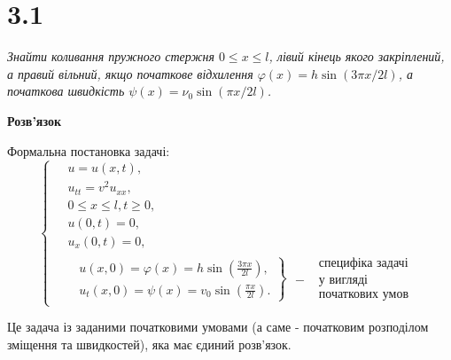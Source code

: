

%


\section[Задача №3.1]{3.1}

\textit{Знайти коливання пружного стержня $0 \leq x \leq l$, лівий кінець якого закріплений, а правий вільний, якщо початкове відхилення $\varphi(x) = h \sin(3\pi x/2l)$, а початкова швидкість $\psi(x) = \nu_0 \sin(\pi x/2l)$.}

\begin{center}
    \textbf{Розв'язок}
\end{center}
Формальна постановка задачі:
\begin{equation} \label{cond3,1}
    \left\{ \begin{aligned} %
        &\;u = u(x,t), \\
        &\;u_{tt} = v^2 u_{xx}, \\
        &\;0 \leq x \leq l, t \geq 0, \\
        &\;u(0,t) = 0,\\
        &\;u_x(0,t) = 0,\\
        &\left.\begin{aligned}
            &u(x,0) = \varphi(x) = h \sin \left(\frac{3 \pi x}{2 l} \right), \\ 
            &u_t(x,0) = \psi(x) = v_0 \sin \left(\frac{\pi x}{2 l}\right).
        \end{aligned}\right\} \; 
        \begin{aligned}
            &\text{ специфіка задачі} \\
          - &\text{ у вигляді } \\
            &\text{ початкових умов } 
        \end{aligned}
    \end{aligned} \right.
\end{equation}

Це задача із заданими початковими умовами (а саме - початковим розподілом зміщення та швидкостей), яка має єдиний розв'язок.

